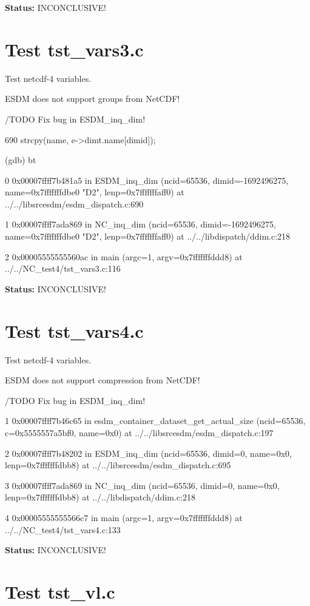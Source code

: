 {\bf \large Status: } INCONCLUSIVE!

\section{Test tst\_vars3.c}

Test netcdf-4 variables.

ESDM does not support groups from NetCDF!

/TODO Fix bug in ESDM\_inq\_dim!

690	    strcpy(name, e->dimt.name[dimid]);

(gdb) bt

0  0x00007ffff7b481a5 in ESDM\_inq\_dim (ncid=65536, dimid=-1692496275, name=0x7fffffffdbe0 "D2", lenp=0x7fffffffaff0) at ../../libsrcesdm/esdm\_dispatch.c:690

1  0x00007ffff7ada869 in NC\_inq\_dim (ncid=65536, dimid=-1692496275, name=0x7fffffffdbe0 "D2", lenp=0x7fffffffaff0) at ../../libdispatch/ddim.c:218

2  0x00005555555560ac in main (argc=1, argv=0x7fffffffddd8) at ../../NC\_test4/tst\_vars3.c:116

{\bf \large Status: } INCONCLUSIVE!

\section{Test tst\_vars4.c}

Test netcdf-4 variables.

ESDM does not support compression from NetCDF!

/TODO Fix bug in ESDM\_inq\_dim!

1  0x00007ffff7b46c65 in esdm\_container\_dataset\_get\_actual\_size (ncid=65536, c=0x5555557a5bf0, name=0x0) at ../../libsrcesdm/esdm\_dispatch.c:197

2  0x00007ffff7b48202 in ESDM\_inq\_dim (ncid=65536, dimid=0, name=0x0, lenp=0x7fffffffdbb8) at ../../libsrcesdm/esdm\_dispatch.c:695

3  0x00007ffff7ada869 in NC\_inq\_dim (ncid=65536, dimid=0, name=0x0, lenp=0x7fffffffdbb8) at ../../libdispatch/ddim.c:218

4  0x00005555555566c7 in main (argc=1, argv=0x7fffffffddd8) at ../../NC\_test4/tst\_vars4.c:133

{\bf \large Status: } INCONCLUSIVE!

\section{Test tst\_vl.c}

